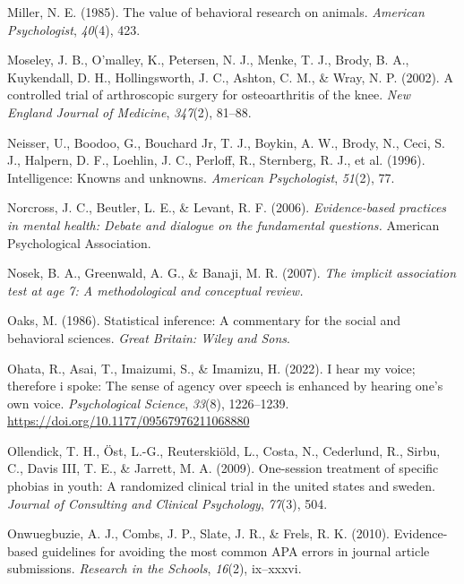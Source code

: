 \documentclass[
]{krantz}
\newlength{\cslhangindent}
\newlength{\cslentryspacingunit} %
\newenvironment{CSLReferences}[2] %
 {%
  \setlength{\parindent}{0pt}
  \ifodd #1
  \let\oldpar\par
  \def\par{\hangindent=\cslhangindent\oldpar}
  \fi
  \setlength{\parskip}{#2\cslentryspacingunit}
 }%
 {}
\begin{document}
\begin{CSLReferences}{1}{0}
\leavevmode{}%
Miller, N. E. (1985). The value of behavioral research on animals. \emph{American Psychologist}, \emph{40}(4), 423.

\leavevmode{}%
Moseley, J. B., O'malley, K., Petersen, N. J., Menke, T. J., Brody, B. A., Kuykendall, D. H., Hollingsworth, J. C., Ashton, C. M., \& Wray, N. P. (2002). A controlled trial of arthroscopic surgery for osteoarthritis of the knee. \emph{New England Journal of Medicine}, \emph{347}(2), 81--88.

\leavevmode{}%
Neisser, U., Boodoo, G., Bouchard Jr, T. J., Boykin, A. W., Brody, N., Ceci, S. J., Halpern, D. F., Loehlin, J. C., Perloff, R., Sternberg, R. J., et al. (1996). Intelligence: Knowns and unknowns. \emph{American Psychologist}, \emph{51}(2), 77.

\leavevmode{}%
Norcross, J. C., Beutler, L. E., \& Levant, R. F. (2006). \emph{Evidence-based practices in mental health: Debate and dialogue on the fundamental questions.} American Psychological Association.

\leavevmode{}%
Nosek, B. A., Greenwald, A. G., \& Banaji, M. R. (2007). \emph{The implicit association test at age 7: A methodological and conceptual review.}

\leavevmode{}%
Oaks, M. (1986). Statistical inference: A commentary for the social and behavioral sciences. \emph{Great Britain: Wiley and Sons}.

\leavevmode{}%
Ohata, R., Asai, T., Imaizumi, S., \& Imamizu, H. (2022). I hear my voice; therefore i spoke: The sense of agency over speech is enhanced by hearing one's own voice. \emph{Psychological Science}, \emph{33}(8), 1226--1239. \url{https://doi.org/10.1177/09567976211068880}

\leavevmode{}%
Ollendick, T. H., Öst, L.-G., Reuterskiöld, L., Costa, N., Cederlund, R., Sirbu, C., Davis III, T. E., \& Jarrett, M. A. (2009). One-session treatment of specific phobias in youth: A randomized clinical trial in the united states and sweden. \emph{Journal of Consulting and Clinical Psychology}, \emph{77}(3), 504.

\leavevmode{}%
Onwuegbuzie, A. J., Combs, J. P., Slate, J. R., \& Frels, R. K. (2010). Evidence-based guidelines for avoiding the most common APA errors in journal article submissions. \emph{Research in the Schools}, \emph{16}(2), ix--xxxvi.


\end{CSLReferences}
\end{document}
